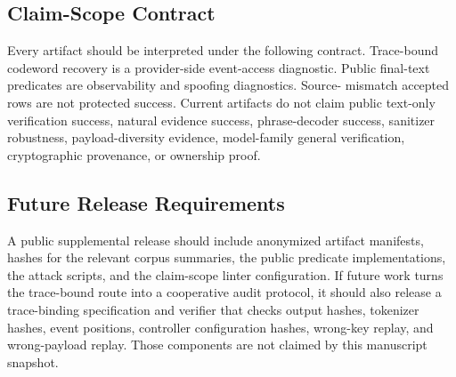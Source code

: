\subsection{Claim-Scope Contract}

Every artifact should be interpreted under the following contract.  Trace-bound
codeword recovery is a provider-side event-access diagnostic.  Public
final-text predicates are observability and spoofing diagnostics.  Source-
mismatch accepted rows are not protected success.  Current artifacts do not
claim public text-only verification success, natural evidence success,
phrase-decoder success, sanitizer robustness, payload-diversity evidence,
model-family general verification, cryptographic provenance, or ownership
proof.

\subsection{Future Release Requirements}

A public supplemental release should include anonymized artifact manifests,
hashes for the relevant corpus summaries, the public predicate implementations,
the attack scripts, and the claim-scope linter configuration.  If future work
turns the trace-bound route into a cooperative audit protocol, it should also
release a trace-binding specification and verifier that checks output hashes,
tokenizer hashes, event positions, controller configuration hashes, wrong-key
replay, and wrong-payload replay.  Those components are not claimed by this
manuscript snapshot.

